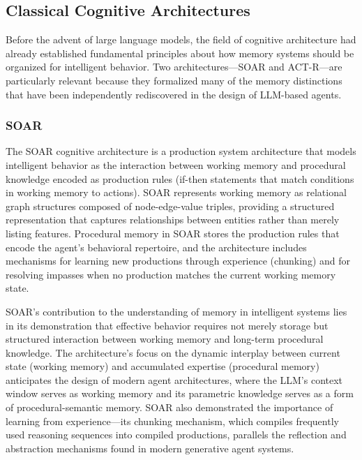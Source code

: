 \documentclass[11pt,letterpaper]{article}
\begin{document}
\subsection{Classical Cognitive Architectures}

Before the advent of large language models, the field of cognitive architecture had already established fundamental principles about how memory systems should be organized for intelligent behavior. Two architectures---SOAR and ACT-R---are particularly relevant because they formalized many of the memory distinctions that have been independently rediscovered in the design of LLM-based agents.

\subsubsection{SOAR}

The SOAR cognitive architecture \cite{laird2012soar} is a production system architecture that models intelligent behavior as the interaction between working memory and procedural knowledge encoded as production rules (if-then statements that match conditions in working memory to actions). SOAR represents working memory as relational graph structures composed of node-edge-value triples, providing a structured representation that captures relationships between entities rather than merely listing features. Procedural memory in SOAR stores the production rules that encode the agent's behavioral repertoire, and the architecture includes mechanisms for learning new productions through experience (chunking) and for resolving impasses when no production matches the current working memory state.

SOAR's contribution to the understanding of memory in intelligent systems lies in its demonstration that effective behavior requires not merely storage but structured interaction between working memory and long-term procedural knowledge. The architecture's focus on the dynamic interplay between current state (working memory) and accumulated expertise (procedural memory) anticipates the design of modern agent architectures, where the LLM's context window serves as working memory and its parametric knowledge serves as a form of procedural-semantic memory. SOAR also demonstrated the importance of learning from experience---its chunking mechanism, which compiles frequently used reasoning sequences into compiled productions, parallels the reflection and abstraction mechanisms found in modern generative agent systems.
\end{document}
